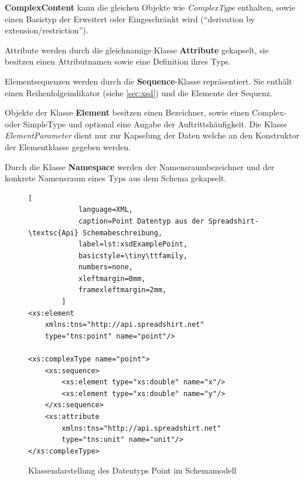 \textbf{ComplexContent} kann die gleichen Objekte wie \emph{ComplexType} enthalten, sowie einen Basistyp der Erweitert oder Eingeschränkt wird (\enquote{derivation by extension/restriction}).

Attribute werden durch die gleichnamige Klasse \textbf{Attribute} gekapselt, sie besitzen einen Attributnamen sowie eine Definition ihres Typs.

Elementsequenzen werden durch die \textbf{Sequence}-Klasse repräsentiert. Sie enthält einen Reihenfolgeindikator (siehe \cref{sec:xsd}) und die Elemente der Sequenz.

Objekte der Klasse \textbf{Element} besitzen einen Bezeichner, sowie einen Complex- oder SimpleType und optional eine Angabe der Auftrittshäufigkeit. Die Klasse \emph{ElementParameter} dient nur zur Kapselung der Daten welche an den Konstruktor der Elementklasse gegeben werden.

Durch die Klasse \textbf{Namespace} werden der Namensraumbezeichner und der konkrete Namensraum eines Typs aus dem Schema gekapselt. 

\begin{figure}[ht]
    \centering
    \begin{minipage}[b]{0.50\linewidth}
        \begin{lstlisting}[
            language=XML,
            caption=Point Datentyp aus der Spreadshirt-\textsc{Api} Schemabeschreibung,
            label=lst:xsdExamplePoint,    
            basicstyle=\tiny\ttfamily,
            numbers=none,
            xleftmargin=0mm,
            framexleftmargin=2mm,
        ]
<xs:element 
    xmlns:tns="http://api.spreadshirt.net" 
    type="tns:point" name="point"/>

<xs:complexType name="point">
    <xs:sequence>
        <xs:element type="xs:double" name="x"/>
        <xs:element type="xs:double" name="y"/>
    </xs:sequence>
    <xs:attribute 
        xmlns:tns="http://api.spreadshirt.net" 
        type="tns:unit" name="unit"/>
</xs:complexType>
        \end{lstlisting}
    \end{minipage}
    \quad    
    \begin{minipage}[b]{0.45\linewidth}
        \caption{Klassendarstellung des Datentyps Point im Schemamodell}
    \end{minipage}
\end{figure}